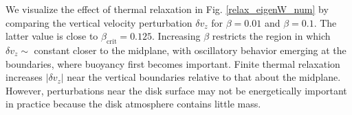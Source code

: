 



We visualize the effect of thermal relaxation in 
Fig. \ref{relax_eigenW_num} by comparing the vertical velocity
perturbation $\delta v_z$ for
$\beta=0.01$ and $\beta=0.1$. The latter value is close to
$\beta_\mathrm{crit}=0.125$. 
Increasing $\beta$ 
restricts  the region in which $\delta v_z\sim $ constant closer to the midplane, with
oscillatory behavior emerging at the boundaries, where buoyancy first
becomes important. Finite thermal relaxation increases $|\delta v_z|$ near the
vertical boundaries relative to that about the midplane. However, 
perturbations near the disk surface may not be energetically important
in practice because the disk atmosphere contains little mass.  


